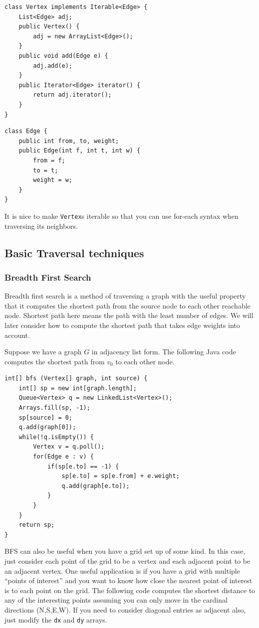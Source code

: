 \documentclass[a4paper,12pt]{article}
\begin{document}
\begin{lstlisting}
class Vertex implements Iterable<Edge> {
	List<Edge> adj;
	public Vertex() {
		adj = new ArrayList<Edge>();
	}
	public void add(Edge e) {
		adj.add(e);
	}
	public Iterator<Edge> iterator() {
		return adj.iterator();
	}
}
\end{lstlisting}

\begin{lstlisting}
class Edge {
	public int from, to, weight;
	public Edge(int f, int t, int w) {
		from = f;
		to = t;
		weight = w;
	}
}
\end{lstlisting}

It is nice to make \lstinline/Vertex/s iterable so that you can use for-each syntax when traversing its neighbors. 

\subsection{Basic Traversal techniques}

\subsubsection{Breadth First Search}

Breadth first search is a method of traversing a graph with the useful property that it computes the shortest path from the source node to each other reachable node. Shortest path here means the path with the least number of edges. We will later consider how to compute the shortest path that takes edge weights into account.

Suppose we have a graph $G$ in adjacency list form. The following Java code computes the shortest path from $v_0$ to each other node. 

\begin{lstlisting}
int[] bfs (Vertex[] graph, int source) {
	int[] sp = new int[graph.length];
	Queue<Vertex> q = new LinkedList<Vertex>();
	Arrays.fill(sp, -1);
	sp[source] = 0;
	q.add(graph[0]);
	while(!q.isEmpty()) {
		Vertex v = q.poll();
		for(Edge e : v) {
			if(sp[e.to] == -1) {
				sp[e.to] = sp[e.from] + e.weight;
				q.add(graph[e.to]);
			}
		}
	}
	return sp;
}
\end{lstlisting}

BFS can also be useful when you have a grid set up of some kind. In this case, just consider each point of the grid to be a vertex and each adjacent point to be an adjacent vertex. One useful application is if you have a grid with multiple ``points of interest'' and you want to know how close the nearest point of interest is to each point on the grid. The following code computes the shortest distance to any of the interesting points assuming you can only move in the cardinal directions (N,S,E,W). If you need to consider diagonal entries as adjacent also, just modify the \lstinline/dx/ and \lstinline/dy/ arrays.
\end{document}
